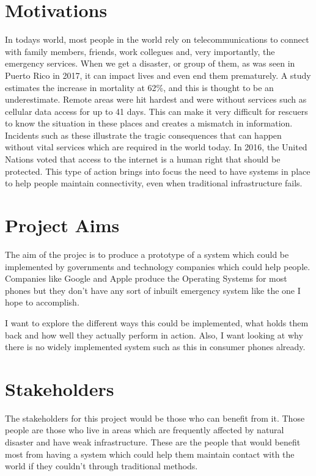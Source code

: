 \documentclass{report}
\begin{document}
\section{Motivations}
In todays world, most people in the world rely on telecommunications to connect with family members, friends, 
work collegues and, very importantly, the emergency services. When we get a disaster, or group of them, as was 
seen in Puerto Rico in 2017, it can impact lives and even end them prematurely. A study estimates the increase in 
mortality at 62\%\cite{kishore2018mortality}, and this is thought to be an underestimate. Remote areas were hit hardest and were without services 
such as cellular data access for up to 41 days. This can make it very difficult for rescuers to know the situation in 
these places and creates a mismatch in information.
\\
Incidents such as these illustrate the tragic consequences that can happen without vital services which are required in the 
world today. In 2016, the United Nations voted that access to the internet is a human right that should be protected\cite{UNResolutionJune2016}. 
This type of action brings into focus the need to have systems in place to help people maintain connectivity, even when traditional infrastructure 
fails. 

\section{Project Aims}

The aim of the projec is to produce a prototype of a system which could be implemented by governments and technology 
companies which could help people. Companies like Google and Apple produce the Operating Systems for most phones but 
they don't have any sort of inbuilt emergency system like the one I hope to accomplish. 

I want to explore the different ways this could be implemented, what holds them back and how well they actually perform 
in action. Also, I want looking at why there is no widely implemented system such as this in consumer phones already. 

\section{Stakeholders}

The stakeholders for this project would be those who can benefit from it. Those people are those who live in areas 
which are frequently affected by natural disaster and have weak infrastructure. These are the people that would benefit 
most from having a system which could help them maintain contact with the world if they couldn't through traditional 
methods.
\end{document}
